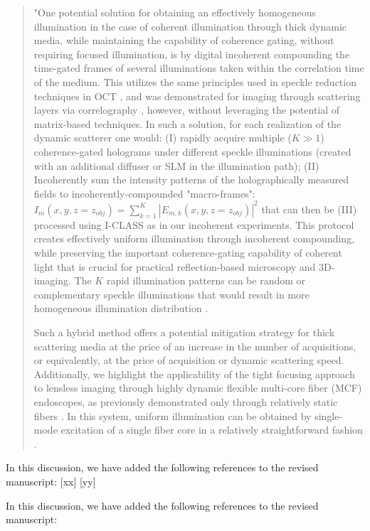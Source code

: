 \documentclass[12pt]{article}
\newenvironment{ourresponse}
    {\begin{tcolorbox}[width=\linewidth,breakable,enhanced,colback=gray!5,colframe=responsecolor!50,title=Response,left=5pt,right=5pt]}
    {\end{tcolorbox}}
\begin{document}
\begin{ourresponse}
\begin{quote}
     "One potential solution for obtaining an effectively homogeneous illumination in the case of coherent illumination through thick dynamic media, while maintaining the capability of coherence gating, without requiring focused illumination, is by digital incoherent compounding the time-gated frames of several illuminations taken within the correlation time of the medium. This utilizes the same principles used in speckle reduction techniques in OCT \cite{liba2017speckle}, and was demonstrated for imaging through scattering layers via correlography \cite{idell1987image, salhov2018depth, metzler2020deepinverse}, however, without leveraging the potential of matrix-based techniques.
     In such a solution, for each realization of the dynamic scatterer one would: (I) rapidly acquire multiple ($K \gg 1$) coherence-gated holograms under different speckle illuminations (created with an additional diffuser or SLM in the illumination path); (II) Incoherently sum the intensity patterns of the holographically measured fields to incoherently-compounded "macro-frames": $I_m(x,y,z=z_{obj}) = \sum_{k=1}^{K}|E_{m,k}(x,y,z=z_{obj})|^2$  that can then be (III) processed using I-CLASS as in our incoherent experiments.
     This protocol creates effectively uniform illumination through incoherent compounding, while preserving the important coherence-gating capability of coherent light that is crucial for practical reflection-based microscopy and 3D-imaging. The $K$ rapid illumination patterns can be random or complementary speckle illuminations that would result in more homogeneous illumination distribution \cite{gateau2017complementary}.

     Such a hybrid method offers a potential mitigation strategy for thick scattering media at the price of an increase in the number of acquisitions, or equivalently, at the price of acquisition or dynamic scattering speed.
     Additionally, we highlight the applicability of the tight focusing approach to lensless imaging through highly dynamic flexible multi-core fiber (MCF) endoscopes, as previously demonstrated only through relatively static fibers \cite{choi2022flexible, haim2025image}. In this system, uniform illumination can be obtained by single-mode excitation of a single fiber core in a relatively straightforward fashion \cite{weinberg2024ptychographic}.
     \end{quote}

In this discussion, we have added the following references to the revised manuscript:
[xx]
[yy]


In this discussion, we have added the following references to the revised manuscript:
\cite{liba2017speckle, idell1987image, salhov2018depth, metzler2020deepinverse, gateau2017complementary, choi2022flexible, haim2025image, weinberg2024ptychographic}


\end{ourresponse}
\end{document}
